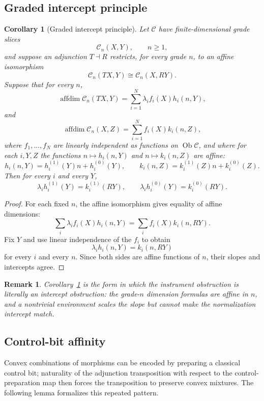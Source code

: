 \documentclass[11pt]{article}
\newtheorem{corollary}[theorem]{Corollary}
\newtheorem{remark}[theorem]{Remark}
\DeclareMathOperator{\affdim}{affdim}
\DeclareMathOperator{\Ob}{Ob}
\begin{document}
\subsection{Graded intercept principle}

\begin{corollary}[Graded intercept principle]
\label{cor:graded-intercept}
Let $\mathcal C$ have finite-dimensional grade slices
\[
\mathcal C_n(X,Y),\qquad n\ge1,
\]
and suppose an adjunction $T\dashv R$ restricts, for every grade $n$, to an
affine isomorphism
\[
\mathcal C_n(TX,Y)\cong\mathcal C_n(X,RY).
\]
Suppose that for every $n$,
\[
\affdim\mathcal C_n(TX,Y)
=
\sum_{i=1}^N \lambda_i f_i(X)h_i(n,Y),
\]
and
\[
\affdim\mathcal C_n(X,Z)
=
\sum_{i=1}^N f_i(X)k_i(n,Z),
\]
where $f_1,\dots,f_N$ are linearly independent as functions on
$\Ob\mathcal C$, and where for each $i,Y,Z$ the functions
$n\mapsto h_i(n,Y)$ and $n\mapsto k_i(n,Z)$ are affine:
\[
h_i(n,Y)=h_i^{(1)}(Y)n+h_i^{(0)}(Y),
\qquad
k_i(n,Z)=k_i^{(1)}(Z)n+k_i^{(0)}(Z).
\]
Then for every $i$ and every $Y$,
\[
\lambda_i h_i^{(1)}(Y)=k_i^{(1)}(RY),
\qquad
\lambda_i h_i^{(0)}(Y)=k_i^{(0)}(RY).
\]
\end{corollary}

\begin{proof}
For each fixed $n$, the affine isomorphism gives equality of affine
dimensions:
\[
\sum_i \lambda_i f_i(X)h_i(n,Y)
=
\sum_i f_i(X)k_i(n,RY).
\]
Fix $Y$ and use linear independence of the $f_i$ to obtain
\[
\lambda_i h_i(n,Y)=k_i(n,RY)
\]
for every $i$ and every $n$. Since both sides are affine functions of $n$,
their slopes and intercepts agree.
\end{proof}

\begin{remark}
Corollary~\ref{cor:graded-intercept} is the form in which the instrument
obstruction is literally an intercept obstruction: the grade-$n$ dimension
formulas are affine in $n$, and a nontrivial environment scales the slope but
cannot make the normalization intercept match.
\end{remark}

\subsection{Control-bit affinity}

Convex combinations of morphisms can be encoded by preparing a classical
control bit; naturality of the adjunction transposition with respect to the
control-preparation map then forces the transposition to preserve convex
mixtures. The following lemma formalizes this repeated pattern.
\end{document}
